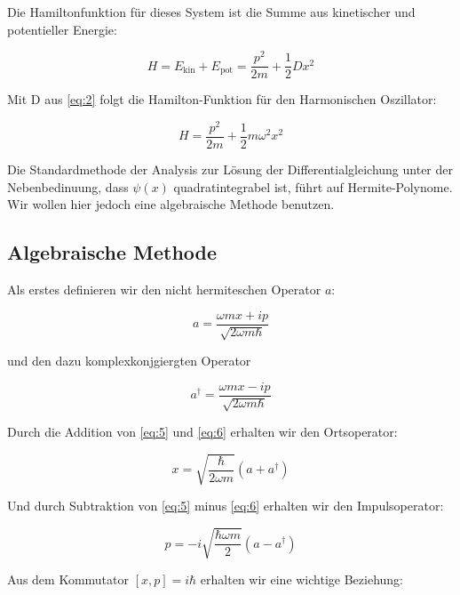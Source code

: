 Die Hamiltonfunktion für dieses System ist die Summe aus kinetischer und potentieller Energie:

\begin{equation}
  \label{eq:3}
  H = E_{\text{kin}}+E_{\text{pot}} = \frac{p^2}{2m} + \frac{1}{2}Dx^2
\end{equation}

Mit D aus \eqref{eq:2} folgt die Hamilton-Funktion für den Harmonischen Oszillator:

\begin{equation}
  \label{eq:4}
  \boxed{ H = \frac{p^2}{2m} +  \frac{1}{2}m\omega^2x^2}
\end{equation}


Die Standardmethode der Analysis zur Lösung der Differentialgleichung unter der Nebenbedinuung, dass \(\psi(x)\) quadratintegrabel ist, führt auf Hermite-Polynome. Wir wollen hier jedoch eine algebraische Methode benutzen.

\subsection*{Algebraische Methode}

Als erstes definieren wir den nicht hermiteschen Operator \(a\):

\begin{equation}
  \label{eq:5}
  a = \frac{\omega m x+ip}{\sqrt{2\omega m\hbar}}  
\end{equation}

und den dazu komplexkonjgiergten Operator

\begin{equation}
  \label{eq:6}
  a^\dagger = \frac{\omega m x-ip}{\sqrt{2\omega m\hbar}}
\end{equation}

Durch die Addition von \eqref{eq:5} und  \eqref{eq:6} erhalten wir den Ortsoperator:

\begin{equation}
  \label{eq:7}
  x = \sqrt{\frac{\hbar}{2\omega m}}(a+a^\dagger)
\end{equation}

Und durch Subtraktion von \eqref{eq:5} minus \eqref{eq:6} erhalten wir den Impulsoperator:

\begin{equation}
  \label{eq:8}
  p = -i\sqrt{\frac{\hbar \omega m}{2}}(a-a^\dagger)
\end{equation}

Aus dem Kommutator \([x,p]=i\hbar\) erhalten wir eine wichtige Beziehung:

